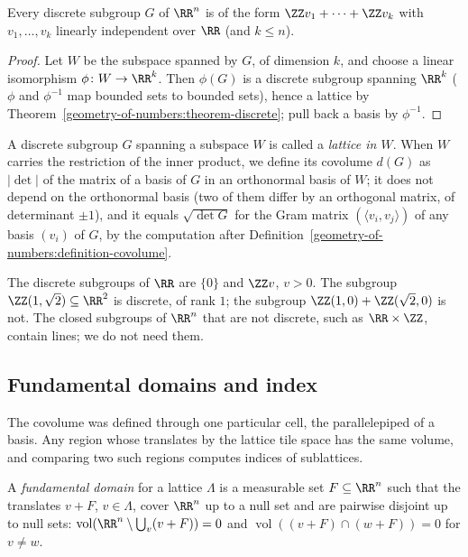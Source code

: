 \begin{corollary}\label{geometry-of-numbers:corollary-discrete}
Every discrete subgroup $G$ of $\RR^n$ is of the form $\ZZ v_1 + \cdots + \ZZ v_k$ with $v_1, \ldots, v_k$ linearly independent over $\RR$ (and $k \leq n$).
\end{corollary}

\begin{proof}
Let $W$ be the subspace spanned by $G$, of dimension $k$, and choose a linear isomorphism $\phi \colon W \to \RR^k$. Then $\phi(G)$ is a discrete subgroup spanning $\RR^k$ ($\phi$ and $\phi^{-1}$ map
bounded sets to bounded sets), hence a lattice by Theorem~\ref{geometry-of-numbers:theorem-discrete}; pull back a basis by $\phi^{-1}$.
\end{proof}

A discrete subgroup $G$ spanning a subspace $W$ is called a \emph{lattice in $W$}. When $W$ carries the restriction of the inner product, we define its covolume $d(G)$ as $|\det|$ of the matrix of a
basis of $G$ in an orthonormal basis of $W$; it does not depend on the orthonormal basis (two of them differ by an orthogonal matrix, of determinant $\pm1$), and it equals $\sqrt{\det G}$ for the Gram
matrix $(\langle v_i, v_j \rangle)$ of any basis $(v_i)$ of $G$, by the computation after Definition~\ref{geometry-of-numbers:definition-covolume}.

\begin{example}\label{geometry-of-numbers:example-discrete-subgroups}
The discrete subgroups of $\RR$ are $\{0\}$ and $\ZZ v$, $v > 0$. The subgroup $\ZZ(1, \sqrt2) \subseteq \RR^2$ is discrete, of rank $1$; the subgroup $\ZZ(1, 0) + \ZZ(\sqrt2, 0)$ is not.
The closed subgroups of $\RR^n$ that are not discrete, such as $\RR \times \ZZ$, contain lines; we do not need them.
\end{example}

\subsection{Fundamental domains and index}\label{geometry-of-numbers:subsection-fundamental-domains}

The covolume was defined through one particular cell, the parallelepiped of a basis. Any region whose translates by the lattice tile space has the same volume, and comparing two such regions
computes indices of sublattices.

\begin{definition}\label{geometry-of-numbers:definition-fundamental-domain}
A \emph{fundamental domain} for a lattice $\Lambda$ is a measurable set $F \subseteq \RR^n$ such that the translates $v + F$, $v \in \Lambda$, cover $\RR^n$ up to a null set and are pairwise disjoint up to
null sets: $\operatorname{vol}(\RR^n \setminus \bigcup_v(v + F)) = 0$ and $\operatorname{vol}((v + F) \cap (w + F)) = 0$ for $v \neq w$.
\end{definition}

